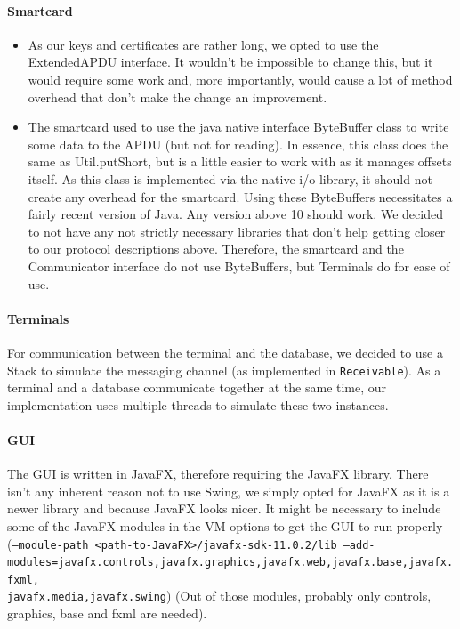\documentclass[a4paper]{article}
\begin{document}
\paragraph{Smartcard}
\begin{itemize}
    \item As our keys and certificates are rather long, we opted to use the ExtendedAPDU interface. It wouldn't be impossible to change this, but it would require some work and, more importantly, would cause a lot of method overhead that don't make the change an improvement. 
    \item The smartcard used to use the java native interface ByteBuffer class to write some data to the APDU (but not for reading). In essence, this class does the same as Util.putShort, but is a little easier to work with as it manages offsets itself. As this class is implemented via the native i/o library, it should not create any overhead for the smartcard. Using these ByteBuffers necessitates a fairly recent version of Java. Any version above 10 should work. We decided to not have any not strictly necessary libraries that don't help getting closer to our protocol descriptions above. Therefore, the smartcard and the Communicator interface do not use ByteBuffers, but Terminals do for ease of use.
\end{itemize}
\paragraph{Terminals}
    For communication between the terminal and the database, we decided to use a Stack to simulate the messaging channel (as implemented in \texttt{Receivable}). As a terminal and a database communicate together at the same time, our implementation uses multiple threads to simulate these two instances.
\paragraph{GUI}
The GUI is written in JavaFX, therefore requiring the JavaFX library. There isn't any inherent reason not to use Swing, we simply opted for JavaFX as it is a newer library and because JavaFX looks nicer. It might be necessary to include some of the JavaFX modules in the VM options to get the GUI to run properly (\texttt{--module-path <path-to-JavaFX>/javafx-sdk-11.0.2/lib --add-modules=javafx.controls,javafx.graphics,javafx.web,javafx.base,javafx.fxml,\\javafx.media,javafx.swing}) (Out of those modules, probably only controls, graphics, base and fxml are needed).
\end{document}
